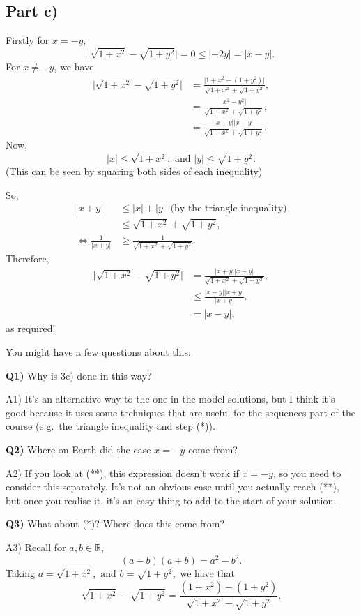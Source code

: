 \documentclass[
  12pt,
  a4paper]{extarticle}
\theoremstyle{plain}
\theoremstyle{definition}
\theoremstyle{plain}
\theoremstyle{plain}
\theoremstyle{plain}
\theoremstyle{plain}
\theoremstyle{definition}
\theoremstyle{definition}
\theoremstyle{remark}
\theoremstyle{remark}
\let\BeginKnitrBlock\begin \let\EndKnitrBlock\end
\renewcommand{\;}{\,}
\begin{document}
\hypertarget{part-c}{%
\subsection*{Part c)}\label{part-c}}

\BeginKnitrBlock{solution*}
Firstly for \(x = -y\), \[\lvert \sqrt{1 + x^2} - \sqrt{1 + y^2}\rvert = 0 \leq \lvert -2y \rvert = \lvert x - y \rvert.\] For \(x \neq -y\), we have
\begin{align}
\lvert \sqrt{1 + x^2} - \sqrt{1 + y^2}\rvert &= \frac{\lvert 1 + x^2 - (1 + y^2) \rvert}{\sqrt{1 + x^2} + \sqrt{1 + y^2}},\tag{*}\\
&= \frac{\lvert x^2 - y^2 \rvert}{\sqrt{1 + x^2} + \sqrt{1 + y^2}},\nonumber\\
&= \frac{\lvert x + y \rvert \lvert x - y \rvert}{\sqrt{1 + x^2} + \sqrt{1 + y^2}}.\nonumber
\end{align}
Now, \[\lvert x \rvert \leq \sqrt{1 + x^2}, \;\;\text{and}\;\; \lvert y \rvert \leq \sqrt{1 + y^2}.\] (This can be seen by squaring both sides of each inequality)

So,
\begin{align*}
\lvert x + y \rvert &\leq \lvert x \rvert + \lvert y \rvert \;\;\; \text{(by the triangle inequality)}\\
&\leq \sqrt{1 + x^2} + \sqrt{1 + y^2},\\
\Leftrightarrow \frac{1}{\lvert x + y \rvert} &\geq \frac{1}{\sqrt{1 + x^2} + \sqrt{1 + y^2}}.
\end{align*}
Therefore,
\begin{align}
\lvert \sqrt{1 + x^2} - \sqrt{1 + y^2}\rvert &= \frac{\lvert x + y \rvert \lvert x - y \rvert}{\sqrt{1 + x^2} + \sqrt{1 + y^2}},\nonumber\\
&\leq \frac{\lvert x - y \rvert\lvert x + y \rvert}{\lvert x + y \rvert},\tag{**}\\
&= \lvert x - y \rvert,\nonumber
\end{align}
as required!
\EndKnitrBlock{solution*}

You might have a few questions about this:

\textbf{Q1)} Why is 3c) done in this way?

A1) It's an alternative way to the one in the model solutions, but I think it's good because it uses some techniques that are useful for the sequences part of the course (e.g.~the triangle inequality and step (*)).

\textbf{Q2)} Where on Earth did the case \(x = -y\) come from?

A2) If you look at (**), this expression doesn't work if \(x = -y\), so you need to consider this separately. It's not an obvious case until you actually reach (**), but once you realise it, it's an easy thing to add to the start of your solution.

\textbf{Q3)} What about (*)? Where does this come from?

A3) Recall for \(a,b \in \mathbb{R}\), \[(a-b)(a+b) = a^2 - b^2.\] Taking \(a = \sqrt{1 + x^2}, \;\; \text{and} \;\; b = \sqrt{1 + y^2},\) we have that \[\sqrt{1 + x^2} - \sqrt{1 + y^2} = \frac{(1+x^2)-(1+y^2)}{\sqrt{1 + x^2} + \sqrt{1 + y^2}}.\]
\end{document}
